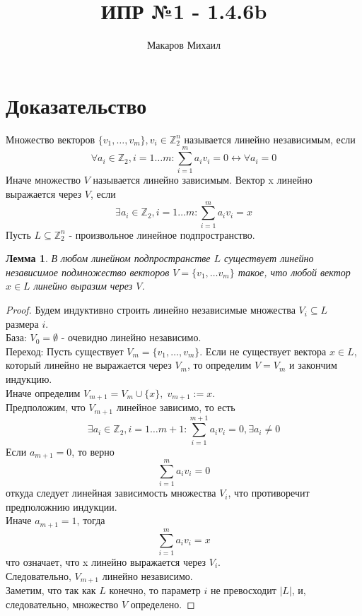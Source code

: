 \documentclass{article}
\title{ИПР №1 - 1.4.6b}
\author{Макаров Михаил}
\date{}
\newtheorem{lemma}{Лемма}
\begin{document}
	\maketitle

	\section{Доказательство}
	
	Множество векторов $ \{ v_1, \dots, v_m \}, v_i \in \mathbb{Z}_2^n $ называется линейно независимым, если 
	\[
		\forall a_i \in \mathbb{Z}_2, i = 1 \ldots m: \sum_{i=1}^{m} a_i v_i = 0 \leftrightarrow \forall a_i = 0
	\]
	Иначе множество $ V $ называется линейно зависимым. 
	Вектор x линейно выражается через $ V $, если
	\[
		\exists a_i \in \mathbb{Z}_2, i = 1 \ldots m: \sum_{i=1}^{m} a_i v_i = x
	\]
	Пусть $ L \subseteq \mathbb{Z}_2^n $ - произвольное линейное подпространство.\\
	\begin{lemma}
	В любом линейном подпространстве $L$ существует линейно независимое подмножество векторов
	$ V = \{ v_1, \ldots v_m \} $ такое, что любой вектор $ x \in L $ линейно выразим через $V$.
	\end{lemma}
	\begin{proof}
	Будем индуктивно строить линейно независимые множества $ V_i \subseteq L $ размера $i$. \\
	База: $ V_0 = \emptyset $ - очевидно линейно независимо. \\
	Переход: Пусть существует $ V_m = \{ v_1, \dots, v_m \} $. Если не существует вектора $x \in L$, который 
	линейно не выражается через $V_m$, то определим $ V = V_m $ и закончим индукцию. \\
	Иначе определим $ V_{m + 1} = V_m \cup \{ x \}, \; v_{m + 1} := x $.\\
	Предположим, что $ V_{m + 1} $ линейное зависимо, то есть 
	\[
		\exists a_i \in \mathbb{Z}_2, i = 1 \ldots m + 1 : \sum_{i=1}^{m + 1} a_i v_i = 0, \exists a_i \neq 0
	\]
	Если $ a_{m + 1} = 0 $, то верно
	\[
		\sum_{i=1}^{m} a_i v_i = 0
	\]
	откуда следует линейная зависимость множества $ V_i $, что противоречит предположнию индукции.\\
	Иначе $ a_{m + 1} = 1$, тогда
	\[
		\sum_{i=1}^{m} a_i v_i = x
	\]
	что означает, что x линейно выражается через $ V_i $. \\
	Следовательно, $ V_{m + 1} $ линейно независимо.\\
	Заметим, что так как $L$ конечно, то параметр $i$ не превосходит $|L|$, и, следовательно, множество $V$ определено.
	\end{proof}
\end{document}
